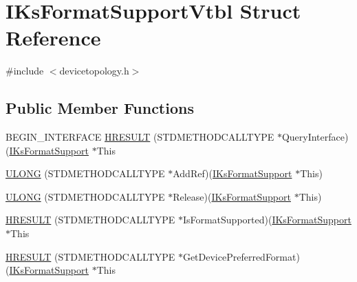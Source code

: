 \hypertarget{struct_i_ks_format_support_vtbl}{}\section{I\+Ks\+Format\+Support\+Vtbl Struct Reference}
\label{struct_i_ks_format_support_vtbl}


{\ttfamily \#include $<$devicetopology.\+h$>$}

\subsection*{Public Member Functions}
\begin{DoxyCompactItemize}
\item 
B\+E\+G\+I\+N\+\_\+\+I\+N\+T\+E\+R\+F\+A\+CE \hyperlink{struct_i_ks_format_support_vtbl_aac8f5d8192af090de0e565350c8293a3}{H\+R\+E\+S\+U\+LT} (S\+T\+D\+M\+E\+T\+H\+O\+D\+C\+A\+L\+L\+T\+Y\+PE $\ast$Query\+Interface)(\hyperlink{devicetopology_8h_a585c794f267602027373173fc1775081}{I\+Ks\+Format\+Support} $\ast$This
\item 
\hyperlink{struct_i_ks_format_support_vtbl_a446d442c3c1b1c680a0095d024f304d2}{U\+L\+O\+NG} (S\+T\+D\+M\+E\+T\+H\+O\+D\+C\+A\+L\+L\+T\+Y\+PE $\ast$Add\+Ref)(\hyperlink{devicetopology_8h_a585c794f267602027373173fc1775081}{I\+Ks\+Format\+Support} $\ast$This)
\item 
\hyperlink{struct_i_ks_format_support_vtbl_af984eeab48b64c4fcd25a00cab435fce}{U\+L\+O\+NG} (S\+T\+D\+M\+E\+T\+H\+O\+D\+C\+A\+L\+L\+T\+Y\+PE $\ast$Release)(\hyperlink{devicetopology_8h_a585c794f267602027373173fc1775081}{I\+Ks\+Format\+Support} $\ast$This)
\item 
\hyperlink{struct_i_ks_format_support_vtbl_aee071c7a8253478cc91115f7aef4e269}{H\+R\+E\+S\+U\+LT} (S\+T\+D\+M\+E\+T\+H\+O\+D\+C\+A\+L\+L\+T\+Y\+PE $\ast$Is\+Format\+Supported)(\hyperlink{devicetopology_8h_a585c794f267602027373173fc1775081}{I\+Ks\+Format\+Support} $\ast$This
\item 
\hyperlink{struct_i_ks_format_support_vtbl_ac4fa95d0adcbb424d73d7312c912b72f}{H\+R\+E\+S\+U\+LT} (S\+T\+D\+M\+E\+T\+H\+O\+D\+C\+A\+L\+L\+T\+Y\+PE $\ast$Get\+Device\+Preferred\+Format)(\hyperlink{devicetopology_8h_a585c794f267602027373173fc1775081}{I\+Ks\+Format\+Support} $\ast$This
\end{DoxyCompactItemize}
